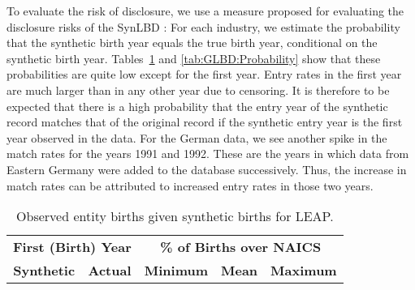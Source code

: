 
To evaluate the risk of disclosure, we use a measure proposed for evaluating the disclosure risks of the SynLBD \citep{KinneyEtAl2011}: For each industry, we estimate the probability that the synthetic birth year equals the true birth year, conditional on the synthetic birth year. Tables~\ref{tab:Can:ProbabilityPrivate} and \ref{tab:GLBD:Probability} show that these probabilities are quite low except for the first year. Entry rates in the first year are much larger than in any other year due to censoring. It is therefore to be expected that there is a high probability that the entry year of the synthetic record matches that of the original record if the synthetic entry year is the first year observed in the data. For the German data, we see another spike in the match rates for the years 1991 and 1992. These are the years in which data from Eastern Germany were added to the database successively. Thus, the increase in match rates can be attributed to increased entry rates in those two years. 

\begin{table}[H]
\centering\footnotesize
\caption{Observed entity births given synthetic births for LEAP.} \label{tab:Can:ProbabilityPrivate} \medskip
\renewcommand{\arraystretch}{1}
\begin{tabular}{c c| c c c}
\toprule
\multicolumn{2}{c|}{\textbf{First (Birth) Year}} &  \multicolumn{3}{c}{\textbf{\% of Births over NAICS}}\\
\textbf{Synthetic}&\textbf{Actual}&\textbf{Minimum}&\textbf{Mean}&\textbf{Maximum}\\
\midrule

\bottomrule
\end{tabular} 
\\
\justify
\end{table}

%

